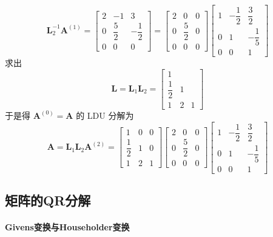$$
    \bm{L}_2^{-1}\bm{A}^{(1)} =\begin{bmatrix}
        2 & -1           & 3             \\
        0 & \dfrac{5}{2} & -\dfrac{1}{2} \\
        0 & 0            & 0
    \end{bmatrix} = \begin{bmatrix}
        2 & 0            & 0 \\
        0 & \dfrac{5}{2} & 0 \\
        0 & 0            & 0
    \end{bmatrix}\begin{bmatrix}
        1 & -\dfrac{1}{2} & \dfrac{3}{2}  \\
        0 & 1             & -\dfrac{1}{5} \\
        0 & 0             & 1
    \end{bmatrix}
$$
求出
$$
    \bm{L} = \bm{L}_1\bm{L}_2 = \begin{bmatrix}
        1            &   &   \\
        \dfrac{1}{2} & 1 &   \\
        1            & 2 & 1
    \end{bmatrix}
$$
于是得 $\bm{A}^{(0)} = \bm{A}$ 的 LDU 分解为
$$
    \bm{A} = \bm{L}_1\bm{L}_2\bm{A}^{(2)} = \begin{bmatrix}
        1            & 0 & 0 \\
        \dfrac{1}{2} & 1 & 0 \\
        1            & 2 & 1
    \end{bmatrix}\begin{bmatrix}
        2 & 0            & 0 \\
        0 & \dfrac{5}{2} & 0 \\
        0 & 0            & 0
    \end{bmatrix}\begin{bmatrix}
        1 & -\dfrac{1}{2} & \dfrac{3}{2}  \\
        0 & 1             & -\dfrac{1}{5} \\
        0 & 0             & 1
    \end{bmatrix}
$$

\subsection{矩阵的QR分解}

\paragraph[]{Givens变换与Householder变换} \

